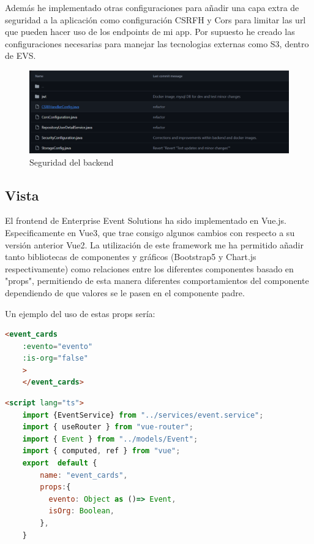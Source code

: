 Además he implementado otras configuraciones para añadir una capa extra de seguridad a la aplicación como configuración CSRFH y Cors para limitar las url 
que pueden hacer uso de los endpoints de mi app. Por supuesto he creado las configuraciones necesarias para manejar las tecnologias externas como S3, dentro de 
EVS.
\begin{figure}[h]
    \centering
    \includegraphics[width=1\textwidth]{security.png} 
    \caption{Seguridad del backend}
    \label{fig:securityClasses}
\end{figure}

\subsection{Vista}
El frontend de Enterprise Event Solutions ha sido implementado en Vue.js. Especificamente en Vue3, que trae consigo algunos cambios con respecto a su versión
anterior Vue2. La utilización de este framework me ha permitido añadir tanto bibliotecas de componentes y gráficos (Bootstrap5 y Chart.js respectivamente)
como relaciones entre los diferentes componentes basado en "props", permitiendo de esta manera diferentes comportamientos del componente dependiendo de
que valores se le pasen en el componente padre.

Un ejemplo del uso de estas props sería:
\myvuestyle
\begin{lstlisting}[language=HTML, caption=Ejemplo del Padre, label=lst:padre]
    <event_cards
    :evento="evento"
    :is-org="false"
    >
    </event_cards>
\end{lstlisting}
\myvuestyle
\begin{lstlisting}[language=HTML, caption=Ejemplo del Hijo, label=lst:hijo]
    <script lang="ts">
    import {EventService} from "../services/event.service";
    import { useRouter } from "vue-router";
    import { Event } from "../models/Event";
    import { computed, ref } from "vue";
    export  default {
        name: "event_cards",
        props:{
          evento: Object as ()=> Event,
          isOrg: Boolean,
        },
    }
\end{lstlisting}


